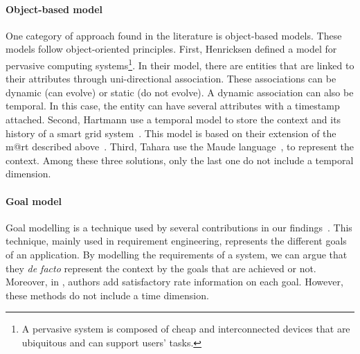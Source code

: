 \paragraph{Object-based model}
One category of approach found in the literature is object-based models.
These models follow object-oriented principles.
First, Henricksen \etal defined a model for pervasive computing systems\footnote{A pervasive system is composed of cheap and interconnected devices that are ubiquitous and can support users' tasks.\cite{DBLP:conf/pervasive/HenricksenIR02}}.
In their model, there are entities that are linked to their attributes through uni-directional association.
These associations can be dynamic (can evolve) or static (do not evolve).
A dynamic association can also be temporal.
In this case, the entity can have several attributes with a timestamp attached.
Second, Hartmann \etal use a temporal model to store the \gls{context} and its history of a smart grid system~\cite{DBLP:conf/smartgridsec/0001FKNT14}.
This model is based on their extension of the \gls{m@rt} described above~\cite{DBLP:conf/seke/0001FNMKT14, DBLP:conf/models/0001FNMKBT14}.
Third, Tahara \etal \cite{DBLP:conf/icse/TaharaOH17} use the Maude language~\cite{DBLP:journals/tcs/ClavelDELMMQ02}, to represent the context. 
Among these three solutions, only the last one do not include a temporal dimension.

\paragraph{Goal model}
Goal modelling is a technique used by several contributions in our findings~\cite{DBLP:conf/icse/CailliauL17, DBLP:conf/icse/IftikharW14a, DBLP:conf/icse/MendoncaAR14, DBLP:conf/icse/ChenPYNZ14, DBLP:conf/re/BaresiPS10}.
This technique, mainly used in requirement engineering, represents the different goals of an application.
By modelling the requirements of a system, we can argue that they \textit{de facto} represent the \gls{context} by the goals that are achieved or not.
Moreover, in \cite{DBLP:conf/icse/CailliauL17}, authors add satisfactory rate information on each goal.
However, these methods do not include a time dimension.

